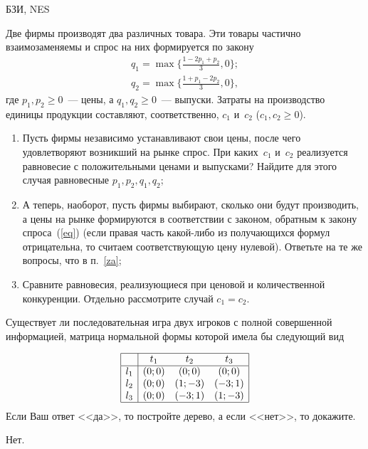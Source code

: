 \begin{problem}
\begin{source}
БЗИ, NES
\end{source} Две
фирмы производят два различных товара. Эти товары частично
взаимозаменяемы и спрос на них формируется по закону
\begin{equation}\label{eq}
\begin{array}{l}
  q_1=\max\biggl\{\frac{1-2p_1+p_2}{3},0\biggr\};\\
  q_2=\max\biggl\{\frac{1+p_1-2p_2}{3},0\biggr\},
\end{array}\end{equation}
где $p_1,p_2\ge 0$~--- цены, а $q_1,q_2\ge 0$~--- выпуски.
Затраты на производство единицы продукции составляют,
соответственно, $c_1$ и~$c_2$ ($c_1,c_2\ge 0$).
\begin{enumerate}
  \item\label{za} Пусть фирмы независимо устанавливают свои цены,
  после чего удовлетворяют возникший на рынке спрос. При каких~$c_1$
  и~$c_2$ реализуется равновесие с положительными ценами и
  выпусками? Найдите для этого случая равновесные $p_1,p_2,q_1,q_2$;
  \item А теперь, наоборот, пусть фирмы выбирают, сколько они
  будут производить, а цены на рынке формируются в соответствии с
  законом, обратным к закону спроса~(\ref{eq}) (если правая часть какой-либо из получающихся
  формул отрицательна, то считаем соответствующую цену нулевой).
  Ответьте на те же вопросы, что в п.~\ref{za};
  \item Сравните равновесия, реализующиеся при ценовой и количественной
  конкуренции. Отдельно рассмотрите случай $c_1=c_2$.
\end{enumerate}

\begin{sol}

\end{sol}
\end{problem}

\begin{problem}

Существует ли последовательная игра двух игроков с полной совершенной информацией,
матрица нормальной формы которой имела бы следующий  вид\par
\[\begin{array}{|c|ccc|}  \hline {} & {t_{1} } & {t_{2} } & {t_{3} } \\  \hline {l_{1} } & {\left(0;0\right)} & {\left(0;0\right)} & {\left(0;0\right)} \\ {l_{2} } & {\left(0;0\right)} & {\left(1;-3\right)} & {\left(-3;1\right)} \\ {l_{3} } & {\left(0;0\right)} & {\left(-3;1\right)} & {\left(1;-3\right)} \\  \hline  \end{array}\]
Если Ваш ответ <<да>>, то постройте дерево, а если <<нет>>, то докажите.



\begin{sol}
Нет.
\end{sol}
\end{problem}






